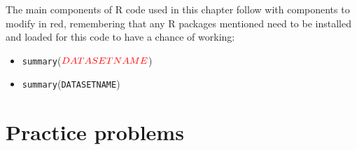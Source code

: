 \documentclass[]{book}
\begin{document}
The main components of R code used in this chapter follow with
components to modify in red, remembering that any R packages mentioned
need to be installed and loaded for this code to have a chance of
working:

\begin{itemize}
\item
  \texttt{summary}(\(\textcolor{red}{DATASETNAME}\))
\item
  \texttt{summary}({\texttt{DATASETNAME}})
\end{itemize}

\section{Practice problems}\label{section2-12}


\end{document}
